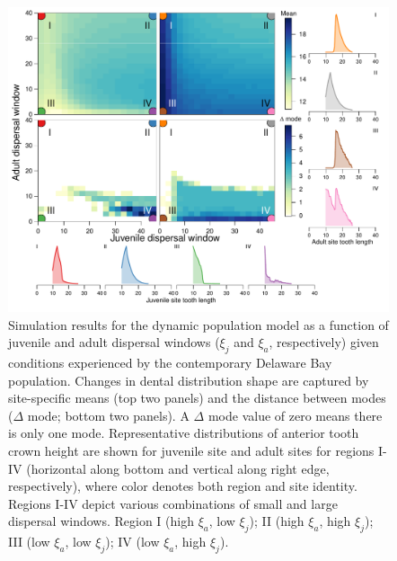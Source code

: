 \documentclass[]{rsos}%
\begin{document}
\begin{figure}[ht]
  \centering
  \includegraphics[width=1\linewidth]{fig_means_peaks_modern_rev.pdf}  

\caption{Simulation results for the dynamic population model as a function of juvenile and adult dispersal windows ($\xi_j$ and $\xi_a$, respectively) given conditions experienced by the contemporary Delaware Bay population. 
Changes in dental distribution shape are captured by site-specific means (top two panels) and the distance between modes ($\Delta$ mode; bottom two panels).
A $\Delta$ mode value of zero means there is only one mode.
Representative distributions of anterior tooth crown height are shown for juvenile site and adult sites for regions I-IV  (horizontal along bottom and vertical along right edge, respectively), where color denotes both region and site identity.
Regions I-IV depict various combinations of small and large dispersal windows. Region I (high $\xi_a$, low $\xi_j$); II (high $\xi_a$, high $\xi_j$); III (low $\xi_a$, low $\xi_j$); IV (low $\xi_a$, high $\xi_j$).
}
\label{fig:simmodern}
\end{figure}
\end{document}

